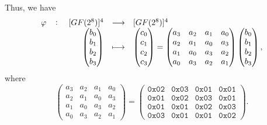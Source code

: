 \newpage
\noindent Thus, we have \[
\fullfunction{\varphi}{[GF(2^8)]^4}{[GF(2^8)]^4}{\begin{pmatrix}
	b_0 \\ b_1 \\ b_2 \\ b_3
\end{pmatrix}}{\begin{pmatrix}
	c_0 \\ c_1 \\ c_2 \\ c_3
\end{pmatrix}=\begin{pmatrix}
a_3 & a_2 & a_1 & a_0 \\
a_2 & a_1 & a_0 & a_3 \\
a_1 & a_0 & a_3 & a_2 \\
a_0 & a_3 & a_2 & a_1
\end{pmatrix}\begin{pmatrix}
b_0 \\ b_1 \\ b_2 \\ b_3
\end{pmatrix},}
\] where \[
\begin{pmatrix}
	a_3 & a_2 & a_1 & a_0 \\
	a_2 & a_1 & a_0 & a_3 \\
	a_1 & a_0 & a_3 & a_2 \\
	a_0 & a_3 & a_2 & a_1
\end{pmatrix} = \begin{pmatrix}
\texttt{0x02} & \texttt{0x03} & \texttt{0x01} & \texttt{0x01}\\
\texttt{0x01} & \texttt{0x02} & \texttt{0x03} & \texttt{0x01}\\
\texttt{0x01} & \texttt{0x01} & \texttt{0x02} & \texttt{0x03}\\
\texttt{0x03} & \texttt{0x01} & \texttt{0x01} & \texttt{0x02}
\end{pmatrix}.
\]



